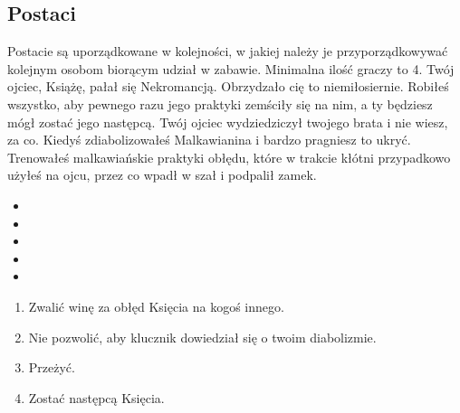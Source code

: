 	\subsection{Postaci}
	\label{sec:characters}
		Postacie są uporządkowane w kolejności, w jakiej należy je przyporządkowywać kolejnym osobom biorącym udział w zabawie.
		Minimalna ilość graczy to 4.
		\thispagestyle{empty}
			{}{
			Twój ojciec, Książę, pałał się Nekromancją.
			Obrzydzało cię to niemiłosiernie.
			Robiłeś wszystko, aby pewnego razu jego praktyki zemściły się na nim, a ty będziesz mógł zostać jego następcą.
			Twój ojciec wydziedziczył twojego brata i nie wiesz, za co.
			Kiedyś zdiabolizowałeś Malkawianina i bardzo pragniesz to ukryć.
			Trenowałeś malkawiańskie praktyki obłędu, które w trakcie kłótni przypadkowo użyłeś na ojcu, przez co wpadł w szał i podpalił zamek.}
			{
				\begin{itemize}[noitemsep]
					\item {}
					\item {}
					\item {}
					\item {}
					\item {}
				\end{itemize}

			}{
				\begin{enumerate}[noitemsep]
					\item Zwalić winę za obłęd Księcia na kogoś innego.
					\item Nie pozwolić, aby klucznik dowiedział się o twoim diabolizmie.
					\item Przeżyć.
					\item Zostać następcą Księcia.
				\end{enumerate}
			}
			{}
			{}
			
